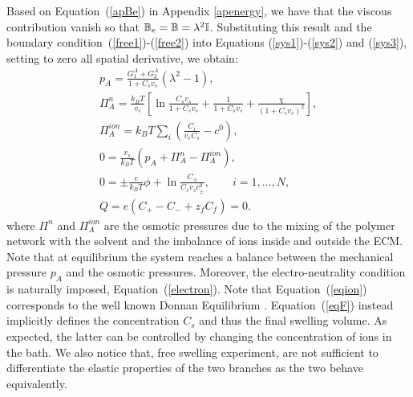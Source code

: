Based on Equation~(\ref{apBe}) in Appendix \ref{apenergy}, we have that the viscous contribution vanish so that $\mathbb{B}_e=\mathbb{B}= \lambda^2 \mathbb{I}$. Substituting this result and the boundary condition~(\ref{free1})-(\ref{free2}) into Equations (\ref{sys1})-(\ref{sys2}) and (\ref{sys3}), setting to zero all spatial derivative, we obtain:
\begin{gather}
p_A = \frac{G^A_1+G^A_2}{1+C_sv_s}(\lambda^2-1),\label{presA}\\
\Pi^{n}_A = \frac{k_BT}{v_s} \left[\ln \frac{C_s v_s}{1+C_s v_s} + \frac{1}{1+C_sv_s} +\frac{\chi}{(1+C_s v_s)^2}\right],\\
\Pi^{ion}_A = k_B T \sum_i \left(\frac{C_i}{v_sC_s}-c^0\right),\\
0 = \frac{v_s}{k_BT} (p_A+\Pi^{n}_A-\Pi^{ion}_A), \\[2mm]
0 = \pm\frac{e}{k_B T} \phi  + \ln \frac{C_\pm}{C_s v_s c_\pm^0},\qquad i=1,\ldots,N,\\[2.5mm]
Q = e\left(C_+-C_-+z_f C_{f}\right)=0.\label{electron}
\end{gather}
where $\Pi^{n}$ and $\Pi^{ion}_A$ are the osmotic pressures due to the mixing of the polymer network with the solvent and the imbalance of ions inside and outside the ECM. 
Note that at equilibrium the system reaches a balance between the mechanical pressure $p_A$ and the osmotic pressures. Moreover, the electro-neutrality condition is naturally imposed, Equation~(\ref{electron}). 
Note that Equation~(\ref{eqion}) corresponds to the well known Donnan Equilibrium \cite{DROZDOVph}. Equation~(\ref{eqF}) instead implicitly defines the concentration $C_s$ and thus the final swelling volume. As expected, the latter can be controlled by changing the concentration of ions in the bath. We also notice that, free swelling experiment, are not sufficient to differentiate the elastic properties of the two branches as the two behave equivalently.